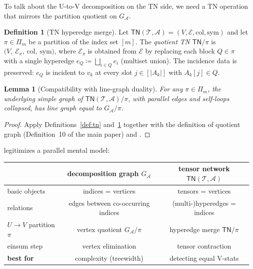 \documentclass[11pt]{article}
\newcommand{\calA}{\mathcal{A}}
\newcommand{\calT}{\mathcal{T}}
\newcommand{\calE}{\mathcal{E}}
\newcommand{\TN}{\mathsf{TN}}
\theoremstyle{plain}
\newtheorem{lemma}[theorem]{Lemma}
\theoremstyle{definition}
\newtheorem{definition}[theorem]{Definition}
\begin{document}
To talk about the U-to-V decomposition on the TN side, we need a TN
operation that mirrors the partition quotient on $G_\calA$.

\begin{definition}[TN hyperedge merge]
\label{def:tn-quotient}
Let $\TN(\calT,\calA)=(V,\calE,\mathrm{col},\mathrm{sym})$ and let $\pi\in\Pi_m$ be a
partition of the index set $[m]$.  The \emph{quotient TN} $\TN/\pi$ is
$\bigl(V,\ \calE_\pi,\ \mathrm{col},\ \mathrm{sym}\bigr)$, where $\calE_\pi$ is
obtained from $\calE$ by replacing each block $Q\in\pi$ with a single
hyperedge $e_Q\coloneqq \bigsqcup_{i\in Q} e_i$ (multiset union).  The
incidence data is preserved: $e_Q$ is incident to $v_k$ at every slot
$j\in[|A_k|]$ with $A_k[j]\in Q$.
\end{definition}

\begin{lemma}[Compatibility with line-graph duality]
\label{lem:quotient-compatibility}
For any $\pi\in\Pi_m$, the underlying simple graph of $\TN(\calT,\calA)/\pi$,
with parallel edges and self-loops collapsed, has line graph equal to
$G_\calA/\pi$.
\end{lemma}

\begin{proof}
Apply Definitions~\ref{def:tn} and~\ref{def:tn-quotient} together with the
definition of quotient graph (Definition~10 of the main paper) and
.
\end{proof}

 legitimizes a parallel mental model:
\begin{center}
\begin{tabular}{lcc}
\toprule
            & \textbf{decomposition graph $G_\calA$} & \textbf{tensor network $\TN(\calT,\calA)$} \\
\midrule
basic objects             & indices = vertices    & tensors = vertices  \\
relations                 & edges between co-occurring indices & (multi-)hyperedges = indices  \\
$U\to V$ partition $\pi$  & vertex quotient $G_\calA/\pi$ & hyperedge merge $\TN/\pi$ \\
einsum step               & vertex elimination    & tensor contraction \\
\textbf{best for}         & complexity (treewidth) & detecting equal V-stats \\
\bottomrule
\end{tabular}
\end{center}
\end{document}
